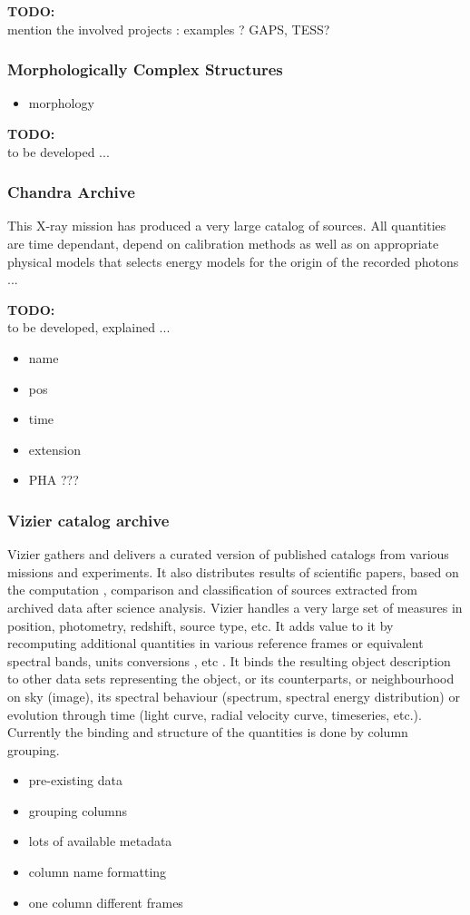 \documentclass[11pt,a4paper]{ivoa}
\newcommand{\TODO}[1]{%
    \noindent%
    \colorbox{todocolor}{%
            \parbox{0.85\linewidth}{\sffamily \textbf{TODO:}\\
            #1}
    }%
    \vspace{2pt}

}
\begin{document}
\TODO{mention the involved projects : examples ? GAPS, TESS? }
\subsubsection{Morphologically Complex Structures}

\begin{itemize}
    \item morphology
\end{itemize}

\TODO{to be developed ...}

\subsubsection{Chandra Archive}
This X-ray mission has produced a very large catalog of sources. %
All quantities are time dependant, depend on calibration methods as well as on appropriate physical
models that selects energy models for the origin of the recorded photons ...


\TODO{to be developed, explained ...}
\begin{itemize}
    \item name
    \item pos
    \item time
    \item extension
    \item PHA ???
\end{itemize}

\subsubsection{Vizier catalog archive  }
Vizier gathers and delivers a curated version of published catalogs from various missions and experiments.
It also distributes results of scientific papers, based on the computation , comparison and classification of sources extracted from archived data after science analysis.
Vizier handles a very large set of measures in position, photometry, redshift, source type, etc.
It adds value to it by recomputing additional quantities in various reference frames or equivalent spectral bands, units conversions , etc .
It binds the resulting object description to other data sets representing the object, or its counterparts, or neighbourhood on sky (image), its spectral behaviour (spectrum, spectral energy distribution) or evolution through time (light curve, radial velocity curve, timeseries, etc.).
Currently the binding and structure of the quantities is done by column grouping.
\begin{itemize}
    \item pre-existing data
    \item grouping columns
    \item lots of available metadata
    \item column name formatting
    \item one column different frames
\end{itemize}
\end{document}
